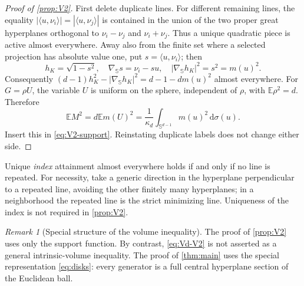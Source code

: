 \documentclass[10pt,reqno]{amsart}
\theoremstyle{definition}
\theoremstyle{remark}
\newtheorem{remark}[theorem]{Remark}
\newcommand{\E}{\mathbb E}
\newcommand{\Sphere}{\mathbb S}
\newcommand{\dd}{\,\mathrm d}
\newcommand{\ip}[2]{\langle #1,#2\rangle}
\begin{document}
\begin{proof}[Proof of \cref{prop:V2}]
First delete duplicate lines. For different remaining lines, the equality
$|\ip{u}{\nu_i}|=|\ip{u}{\nu_j}|$ is contained in the union of the two proper great hyperplanes orthogonal to $\nu_i-\nu_j$ and $\nu_i+\nu_j$. Thus a unique quadratic piece is active almost everywhere. Away also from the finite set where a selected projection has absolute value one, put $s=\ip{u}{\nu_i}$; then
\[
h_K=\sqrt{1-s^2},\quad
\nabla_{\Sphere}s=\nu_i-su,\quad
|\nabla_{\Sphere}h_K|^2=s^2=m(u)^2.
\]
Consequently $(d-1)h_K^2-|\nabla_{\Sphere}h_K|^2=d-1-dm(u)^2$ almost everywhere.
For $G=\rho U$, the variable $U$ is uniform on the sphere, independent of $\rho$, with $\E\rho^2=d$. Therefore
\begin{equation}\label{eq:radial-moment}
\E M^2=d\E m(U)^2=\frac1{\kappa_d}\int_{\Sphere^{d-1}}m(u)^2\dd\sigma(u).
\end{equation}
Insert this in \eqref{eq:V2-support}. Reinstating duplicate labels does not change either side.
\end{proof}
Unique \emph{index} attainment almost everywhere holds if and only if no line is repeated. For necessity, take a generic direction in the hyperplane perpendicular to a repeated line, avoiding the other finitely many hyperplanes; in a neighborhood the repeated line is the strict minimizing line. Uniqueness of the index is not required in \cref{prop:V2}.

\begin{remark}[Special structure of the volume inequality]\label{rem:special-structure}
The proof of \cref{prop:V2} uses only the support function. By contrast, \eqref{eq:Vd-V2} is not asserted as a general intrinsic-volume inequality. The proof of \cref{thm:main} uses the special representation \eqref{eq:disks}: every generator is a full central hyperplane section of the Euclidean ball.
\end{remark}
\end{document}
